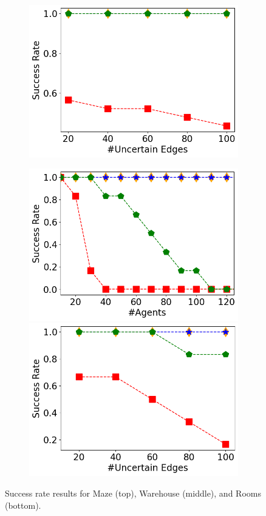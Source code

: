 \documentclass[letterpaper]{article} %
\def\
UrlFont{\rm}  %
\theoremstyle{definition}
\begin{document}
\begin{figure}[tbh]
\begin{subfigure}[b]{\columnwidth}
      \includegraphics[width=0.47\columnwidth]{Figures/warehouse/mixed_small_figures/Success-Rate(UEs)_k=40_ID_ONLY.png}
    \end{subfigure}
    \begin{subfigure}[b]{\columnwidth}\centering
      \includegraphics[width=0.47\columnwidth]{Figures/room/mixed_small_figures/Success-Rate(k)_pos=100_ID_ONLY.png}
      \includegraphics[width=0.47\columnwidth]{Figures/room/mixed_small_figures/Success-Rate(UEs)_k=30_ID_ONLY.png}
    \end{subfigure}
    \caption{Success rate results for Maze (top), Warehouse (middle), and Rooms (bottom).}
    \label{fig:success-rate}
\end{figure}
\end{document}
